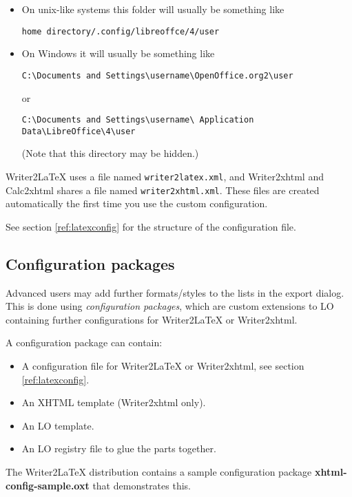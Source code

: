 \documentclass{article}
\newcommand\textstyleSourceText[1]{\texttt{\textmd{#1}}}
\newcommand\liststyleLvi{%
\renewcommand\labelitemi{${\bullet}$}
\renewcommand\labelitemii{${\circ}$}
\renewcommand\labelitemiii{${\blacksquare}$}
\renewcommand\labelitemiv{${\bullet}$}
}
\newcommand\liststyleLvii{%
\renewcommand\labelitemi{${\bullet}$}
\renewcommand\labelitemii{${\circ}$}
\renewcommand\labelitemiii{${\blacksquare}$}
\renewcommand\labelitemiv{${\bullet}$}
}
\begin{document}
\liststyleLvi
\begin{itemize}
\item On unix-like systems this folder will usually be something like

\textstyleSourceText{home directory/.config/libreoffce/4/user}
\item On Windows it will usually be something like

\textstyleSourceText{C:{\textbackslash}Documents and Settings{\textbackslash}username{\textbackslash}OpenOffice.org2{\textbackslash}user}

or

\textstyleSourceText{C:{\textbackslash}Documents and Settings{\textbackslash}username{\textbackslash} Application Data{\textbackslash}LibreOffice{\textbackslash}4{\textbackslash}user}

(Note that this directory may be hidden.)
\end{itemize}
{\mdseries
Writer2LaTeX uses a file named \textstyleSourceText{writer2latex.xml}, and Writer2xhtml and Calc2xhtml shares a file named \textstyleSourceText{writer2xhtml.xml}. These files are created automatically the first time you use the custom configuration.}

{\mdseries
See section \ref{ref:latexconfig} for the structure of the configuration file.}

\subsection{Configuration packages}
\label{ref:configpackages}{\mdseries
Advanced users may add further formats/styles to the lists in the export dialog. This is done using \emph{configuration packages}, which are custom extensions to LO containing further configurations for Writer2LaTeX or Writer2xhtml.}

{\mdseries
A configuration package can contain:}

\liststyleLvii
\begin{itemize}
\item A configuration file for Writer2LaTeX or Writer2xhtml, see section \ref{ref:latexconfig}.
\item An XHTML template (Writer2xhtml only).
\item An LO template.
\item An LO registry file to glue the parts together.
\end{itemize}
{\mdseries
The Writer2LaTeX distribution contains a sample configuration package \textbf{xhtml-con}\textbf{fig-sample.oxt} that demonstrates this.}
\end{document}
